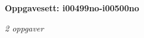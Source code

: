 \centerline{\bf Oppgavesett: i00499no-i00500no}
\vskip 10pt
\centerline{\it 2 oppgaver}\vskip 10pt
\vskip 10pt

